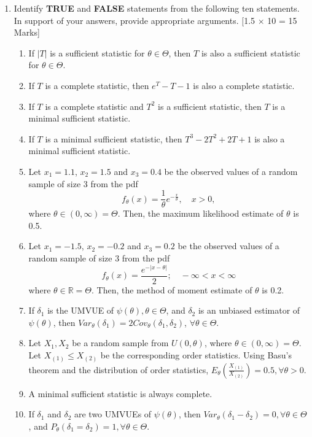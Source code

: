\documentclass[11pt]{article}
\begin{document}
\begin{enumerate}
    \item Identify \textbf{TRUE} and \textbf{FALSE} statements from the following ten statements. In support of your answers, provide appropriate arguments. \hfill [1.5 $\times$ 10 = 15 Marks]
    
    \begin{enumerate}
        \item[(i)] If $|T|$ is a sufficient statistic for $\theta \in \Theta$, then $T$ is also a sufficient statistic for $\theta \in \Theta$.
        \item[(ii)] If $T$ is a complete statistic, then $e^{T}-T-1$ is also a complete statistic.
        \item[(iii)] If $T$ is a complete statistic and $T^{2}$ is a sufficient statistic, then $T$ is a minimal sufficient statistic.
        \item[(iv)] If $T$ is a minimal sufficient statistic, then $T^{3}-2T^{2}+2T+1$ is also a minimal sufficient statistic.
        \item[(v)] Let $x_{1}=1.1$, $x_{2}=1.5$ and $x_{3}=0.4$ be the observed values of a random sample of size 3 from the pdf
        \[ f_{\theta}(x)=\frac{1}{\theta}e^{-\frac{x}{\theta}}, \quad x>0, \]
        where $\theta \in (0, \infty) = \Theta$. Then, the maximum likelihood estimate of $\theta$ is 0.5.
        \item[(vi)] Let $x_{1}=-1.5$, $x_{2}=-0.2$ and $x_{3}=0.2$ be the observed values of a random sample of size 3 from the pdf
        \[ f_{\theta}(x)=\frac{e^{-|x-\theta|}}{2}; \quad -\infty < x < \infty \]
        where $\theta \in \mathbb{R} = \Theta$. Then, the method of moment estimate of $\theta$ is 0.2.
        \item[(vii)] If $\delta_{1}$ is the UMVUE of $\psi(\theta), \theta \in \Theta$, and $\delta_{2}$ is an unbiased estimator of $\psi(\theta)$, then $Var_{\theta}(\delta_{1})=2Cov_{\theta}(\delta_{1},\delta_{2})$, $\forall \theta \in \Theta$.
        \item[(viii)] Let $X_1, X_{2}$ be a random sample from $U(0,\theta)$, where $\theta \in (0,\infty) = \Theta$. Let $X_{(1)} \le X_{(2)}$ be the corresponding order statistics. Using Basu's theorem and the distribution of order statistics, $E_{\theta}\left(\frac{X_{(1)}}{X_{(2)}}\right)=0.5, \forall \theta > 0$.
        \item[(ix)] A minimal sufficient statistic is always complete.
        \item[(x)] If $\delta_{1}$ and $\delta_{2}$ are two UMVUEs of $\psi(\theta)$, then $Var_{\theta}(\delta_{1}-\delta_{2})=0, \forall \theta \in \Theta$, and $P_{\theta}(\delta_{1} = \delta_{2}) = 1, \forall \theta \in \Theta$.
    \end{enumerate}


\end{enumerate}
\end{document}
